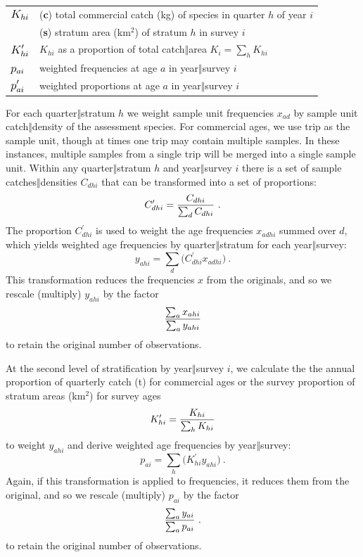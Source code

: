 \documentclass[11pt]{book}\usepackage[]{graphicx}\usepackage[]{color}
\newcommand{\eqn}[1]{\begin{equation}#1\end{equation}}
\newcommand{\gfrac}[2]{\genfrac{}{}{}{0}{#1}{#2}}
\newcommand{\eor}[2]{{#1$\Vert$#2}}
\newcommand{\bM}[1]{\mathlarger{\mathlarger{#1}}}
\begin{document}
\begin{longtable}[1]{l>{\raggedright\arraybackslash}p{} }
$\bM{K_{hi}}$ & (\textbf{c}) total commercial catch (kg) of species in quarter $h$ of year $i$ \\
& (\textbf{s}) stratum area (km$^2$) of stratum $h$ in survey $i$ \\
$\bM{K_{hi}^\prime}$ & $K_{hi}$ as a proportion of total \eor{catch}{area} $K_i = \sum_{h} K_{hi}$ \\
$\bM{p_{ai}}$ & weighted frequencies at age $a$ in \eor{year}{survey} $i$ \\
$\bM{p_{ai}^\prime}$ & weighted proportions at age $a$ in \eor{year}{survey} $i$ \\ %
\hline 
\end{longtable}
\usefont{\encodingdefault}{\familydefault}{\seriesdefault}{\shapedefault}\normalsize

For each \eor{quarter}{stratum} $h$ we weight sample unit frequencies $x_{ad}$ by sample unit \eor{catch}{density} of the assessment species. For commercial ages, we use trip as the sample unit, though at times one trip may contain multiple samples. In these instances, multiple samples from a single trip will be merged into a single sample unit. Within any \eor{quarter}{stratum} $h$ and \eor{year}{survey} $i$ there is a set of sample \eor{catches}{densities} $C_{dhi}$ that can be transformed into a set of proportions:
%
\eqn{C_{dhi}^\prime = \gfrac{C_{dhi}}{\sum_{d} C_{dhi}}~.}
%
The proportion $C_{dhi}^\prime$ is used to weight the age frequencies $x_{adhi}$ summed over $d$, which yields weighted age frequencies by \eor{quarter}{stratum} for each \eor{year}{survey}:
%
\eqn{y_{ahi} = \sum_{d} \big(C_{dhi}^\prime x_{adhi}\big)~.}
%
This transformation reduces the frequencies $x$ from the originals, and so we rescale (multiply) $y_{ahi}$ by the factor
%
\eqn{\gfrac{\sum_{a} x_{ahi}}{\sum_{a} y_{ahi}}}
%
to retain the original number of observations.

At the second level of stratification by \eor{year}{survey} $i$, we calculate the the annual proportion of quarterly catch (t) for commercial ages or the survey proportion of stratum areas (km$^2$) for survey ages
%
\eqn{K_{hi}^\prime = \gfrac{K_{hi}}{\sum_{h} K_{hi}}}
%
to weight $y_{ahi}$ and derive weighted age frequencies by \eor{year}{survey}:
%
\eqn{p_{ai} = \sum_{h} \big(K_{hi}^\prime y_{ahi}\big)~.}
%
Again, if this transformation is applied to frequencies, it reduces them from the original, and so we rescale (multiply) $p_{ai}$ by the factor
%
\eqn{\gfrac{\sum_{a} y_{ai}}{\sum_{a} p_{ai}}~.}
%
to retain the original number of observations.
\end{document}
